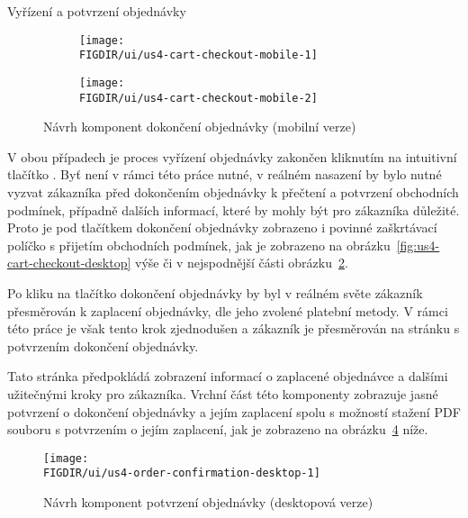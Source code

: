 \begin{subsection}{Vyřízení a potvrzení objednávky}
    \begin{figure}[H]
        \centering
        \begin{subfigure}{0.4\textwidth}
            \texttt{[image: \\FIGDIR/ui/us4-cart-checkout-mobile-1]}
            \label{fig:us4-cart-checkout-mobile-1}
        \end{subfigure}
        \hfill
        \begin{subfigure}{0.4\textwidth}
            \texttt{[image: \\FIGDIR/ui/us4-cart-checkout-mobile-2]}
            \label{fig:us4-cart-checkout-mobile-2}
        \end{subfigure}

        \caption{Návrh komponent dokončení objednávky (mobilní verze)}
        \label{fig:us4-cart-checkout-mobile}
    \end{figure}

    V obou případech je proces vyřízení objednávky zakončen kliknutím na intuitivní tlačítko .
    Byť není v rámci této práce nutné, v reálném nasazení by bylo nutné vyzvat zákazníka před dokončením objednávky k přečtení a potvrzení obchodních podmínek, případně dalších informací, které by mohly být pro zákazníka důležité.
    Proto je pod tlačítkem dokončení objednávky zobrazeno i povinné zaškrtávací políčko s přijetím obchodních podmínek, jak je zobrazeno na obrázku~\ref{fig:us4-cart-checkout-desktop} výše či v nejspodnější části obrázku~\ref{fig:us4-cart-checkout-mobile-2}.

    Po kliku na tlačítko dokončení objednávky by byl v reálném světe zákazník přesměrován k zaplacení objednávky, dle jeho zvolené platební metody.
    V rámci této práce je však tento krok zjednodušen a zákazník je přesměrován na stránku s potvrzením dokončení objednávky.

    Tato stránka předpokládá zobrazení informací o zaplacené objednávce a dalšími užitečnými kroky pro zákazníka.
    Vrchní část této komponenty zobrazuje jasné potvrzení o dokončení objednávky a jejím zaplacení spolu s možností stažení PDF souboru s potvrzením o jejím zaplacení, jak je zobrazeno na obrázku~\ref{fig:us4-order-confirmation-desktop} níže.

    \begin{figure}[H]
        \centering
        \texttt{[image: \\FIGDIR/ui/us4-order-confirmation-desktop-1]}
        \caption{Návrh komponent potvrzení objednávky (desktopová verze)}
        \label{fig:us4-order-confirmation-desktop}
    \end{figure}


\end{subsection}
